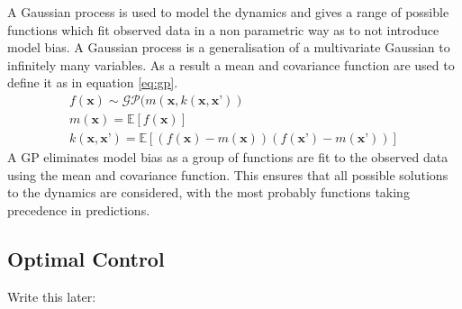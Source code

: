 \documentclass[twoside,twocolumn,12pt]{article}
\begin{document}
A Gaussian process is used to model the dynamics and gives a range of possible functions which fit observed data in a non parametric way as to not introduce model bias. A Gaussian process is a generalisation of a multivariate Gaussian to infinitely many variables. As a result a mean and covariance function are used to define it as in equation \ref{eq:gp}.
\begin{equation}\label{eq:gp}
\begin{gathered}
f(\textbf{x}) \sim \mathcal{GP}(m(\textbf{x},k(\textbf{x},\textbf{x'})) \\
m(\textbf{x}) = \mathbb{E}[f(\textbf{x})]  \\
k(\textbf{x},\textbf{x'}) = \mathbb{E}[(f(\textbf{x})-m(\textbf{x}))( f(\textbf{x'})-m(\textbf{x'}))]
\end{gathered}
\end{equation}
A GP eliminates model bias as a group of functions are fit to the observed data using the mean and covariance function. This ensures that all possible solutions to the dynamics are considered, with the most probably functions taking precedence in predictions.

\subsection{Optimal Control}
 \color{red}
 Write this later:
 \color{black}
 
\end{document}
